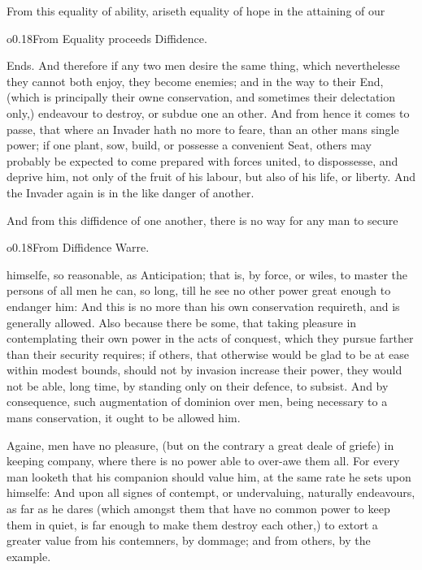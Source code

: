 From this equality of ability, ariseth equality of hope in the
attaining of our \begin{wrapfigure}[5]{o}{0.18\textwidth}\wrapadj From
Equality proceeds Diffidence. \end{wrapfigure} Ends. And therefore if
any two men desire the same thing, which neverthelesse they cannot
both enjoy, they become enemies; and in the way to their End, (which
is principally their owne conservation, and sometimes their
delectation only,) endeavour to destroy, or subdue one an other. And
from hence it comes to passe, that where an Invader hath no more to
feare, than an other mans single power; if one plant, sow, build, or
possesse a convenient Seat, others may probably be expected to come
prepared with forces united, to dispossesse, and deprive him, not only
of the fruit of his labour, but also of his life, or liberty. And the
Invader again is in the like danger of another.

And from this diffidence of one another, there is no way for any man
to secure \begin{wrapfigure}[4]{o}{0.18\textwidth}\wrapadj From
Diffidence Warre. \end{wrapfigure} himselfe, so reasonable, as
Anticipation; that is, by force, or wiles, to master the persons of
all men he can, so long, till he see  no other power great
enough to endanger him: And this is no more than his own conservation
requireth, and is generally allowed. Also because there be some, that
taking pleasure in contemplating their own power in the acts of
conquest, which they pursue farther than their security requires; if
others, that otherwise would be glad to be at ease within modest
bounds, should not by invasion increase their power, they would not be
able, long time, by standing only on their defence, to subsist. And by
consequence, such augmentation of dominion over men, being necessary
to a mans conservation, it ought to be allowed him.

Againe, men have no pleasure, (but on the contrary a great deale of
griefe) in keeping company, where there is no power able to over-awe
them all. For every man looketh that his companion should value him,
at the same rate he sets upon himselfe: And upon all signes of
contempt, or undervaluing, naturally endeavours, as far as he dares
(which amongst them that have no common power to keep them in quiet,
is far enough to make them destroy each other,) to extort a greater
value from his contemners, by dommage; and from others, by the
example.

